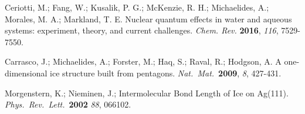 \documentclass[aps,twocolumn,amssymb,amsfonts,amsmath,showpacs,final,a4paper,superscriptaddress]{revtex4-2}
\begin{document}
\begin{thebibliography}{99}
 Ceriotti, M.; Fang, W.; Kusalik, P. G.; McKenzie, R. H.; Michaelides, A.; Morales, M. A.; Markland, T. E. Nuclear quantum effects in water and aqueous systems: experiment, theory, and current challenges. \textit{Chem. Rev.} \textbf{2016}, \textit{116}, 7529-7550.

 Carrasco, J.; Michaelides, A.; Forster, M.; Haq, S.; Raval, R.; Hodgson, A. A one-dimensional ice structure built from pentagons. \textit{Nat.\ Mat.}\ \textbf{2009}, \textit{8}, 427-431.

Morgenstern, K.; Nieminen, J.; Intermolecular Bond Length of Ice on Ag(111).
\textit{Phys.\ Rev.\ Lett.}\ \textbf{2002} \textit{88}, 066102.

\end{thebibliography}
\end{document}
